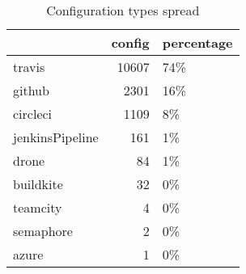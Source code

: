 \begin {table}[!htbp]

\caption{Configuration types spread}
\label{table_config_types}
\begin{tabular}{lrl}
\hline
{} &  config & percentage \\ \hline

travis          &   10607 &        74\% \\ \hline
github          &    2301 &        16\% \\ \hline
circleci        &    1109 &         8\% \\ \hline
jenkinsPipeline &     161 &         1\% \\ \hline
drone           &      84 &         1\% \\ \hline
buildkite       &      32 &         0\% \\ \hline
teamcity        &       4 &         0\% \\ \hline
semaphore       &       2 &         0\% \\ \hline
azure           &       1 &         0\% \\ \hline

\end{tabular}
\end{table}
